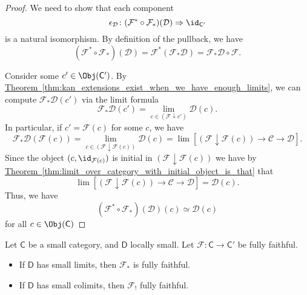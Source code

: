 \documentclass[notes.tex]{subfiles}
\begin{document}
\begin{proof}
  We need to show that each component
  \begin{equation*}
    \epsilon_{\mathcal{D}}\colon (\mathcal{F}^{*} \circ \mathcal{F}_{*})(\mathcal{D}) \Rightarrow \id_{\mathsf{C}'}
  \end{equation*}
  is a natural isomorphism. By definition of the pullback, we have
  \begin{equation*}
    (\mathcal{F}^{*} \circ \mathcal{F}_{*})(\mathcal{D}) = \mathcal{F}^{*}(\mathcal{F}_{*}\mathcal{D}) = \mathcal{F}_{*}\mathcal{D} \circ \mathcal{F}.
  \end{equation*}

  Consider some $c' \in \Obj(\mathsf{C}')$. By \hyperref[thm:kan_extensions_exist_when_we_have_enough_limits]{Theorem~\ref*{thm:kan_extensions_exist_when_we_have_enough_limits}}, we can compute $\mathcal{F}_{*}\mathcal{D}(c')$ via the limit formula
  \begin{equation*}
    \mathcal{F}_{*}\mathcal{D}(c') = \lim_{c \in (\mathcal{F} \downarrow c')} \mathcal{D}(c).
  \end{equation*}
  In particular, if $c' = \mathcal{F}(c)$ for some $c$, we have
  \begin{equation*}
    \mathcal{F}_{*}\mathcal{D}(\mathcal{F}(c)) = \lim_{c \in (\mathcal{F} \downarrow \mathcal{F}(c))} \mathcal{D}(c) = \lim\left[ (\mathcal{F} \downarrow \mathcal{F}(c)) \to \mathcal{C} \to \mathcal{D} \right].
  \end{equation*}
  Since the object $(c, \id_{\mathcal{F}(c)})$ is initial in $(\mathcal{F} \downarrow \mathcal{F}(c))$ we have by \hyperref[thm:limit_over_category_with_initial_object_is_that]{Theorem~\ref*{thm:limit_over_category_with_initial_object_is_that}} that
  \begin{equation*}
    \lim\left[ (\mathcal{F} \downarrow \mathcal{F}(c)) \to \mathcal{C} \to \mathcal{D} \right] = \mathcal{D}(c).
  \end{equation*}
  Thus, we have
  \begin{equation*}
    (\mathcal{F}^{*} \circ \mathcal{F}_{*})(\mathcal{D})(c) \simeq \mathcal{D}(c)
  \end{equation*}
  for all $c \in \Obj(\mathsf{C})$
\end{proof}

\begin{corollary}
  Let $\mathsf{C}$ be a small category, and $\mathsf{D}$ locally small. Let $\mathcal{F}\colon \mathsf{C} \to \mathsf{C'}$ be fully faithful.
  \begin{itemize}
    \item If $\mathsf{D}$ has small limits, then $\mathcal{F}_{*}$ is fully faithful.

    \item If $\mathsf{D}$ has small colimits, then $\mathcal{F}_{!}$ fully faithful.
  \end{itemize}
\end{corollary}
\end{document}
